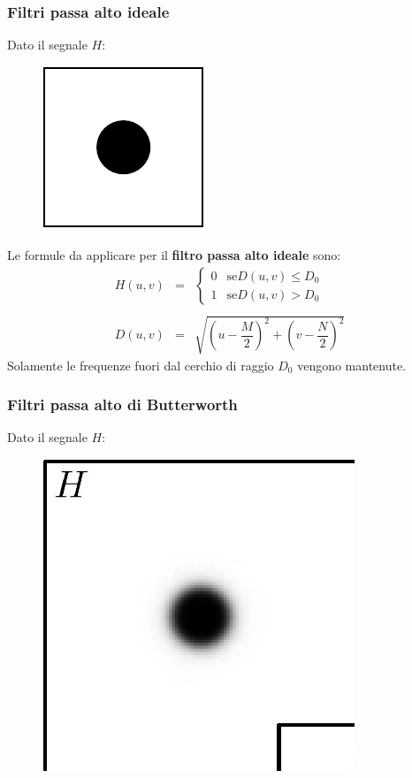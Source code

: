 \documentclass[a4paper]{article}
\begin{document}
	\subsubsection{Filtri passa alto ideale}
	
	Dato il segnale $H$:
	\begin{figure}[!htp]
		\centering
		\includegraphics[width=.3\textwidth]{img/filtro_passa_alto_ideale.pdf}
	\end{figure}
	
	\noindent
	Le formule da applicare per il \textcolor{Red3}{\textbf{filtro passa alto ideale}} sono:
	\begin{equation*}
		\begin{array}{lll}
			H\left(u,v\right) & = & \begin{cases}
				0 & \text{se} D\left(u,v\right) \le D_{0} \\
				1 & \text{se} D\left(u,v\right) > D_{0}
			\end{cases} \\
			&& \\
			D\left(u,v\right) & = & \sqrt{\left(u - \dfrac{M}{2}\right)^{2} + \left(v - \dfrac{N}{2}\right)^{2}}
		\end{array}
	\end{equation*}
	Solamente le frequenze fuori dal cerchio di raggio $D_{0}$ vengono mantenute.
	
	\subsubsection{Filtri passa alto di Butterworth}
	
	Dato il segnale $H$:
	\begin{figure}[!htp]
		\centering
		\includegraphics[width=.3\textwidth]{img/filtro_passa_alto_butterworth.png}
	\end{figure}
	
\end{document}
